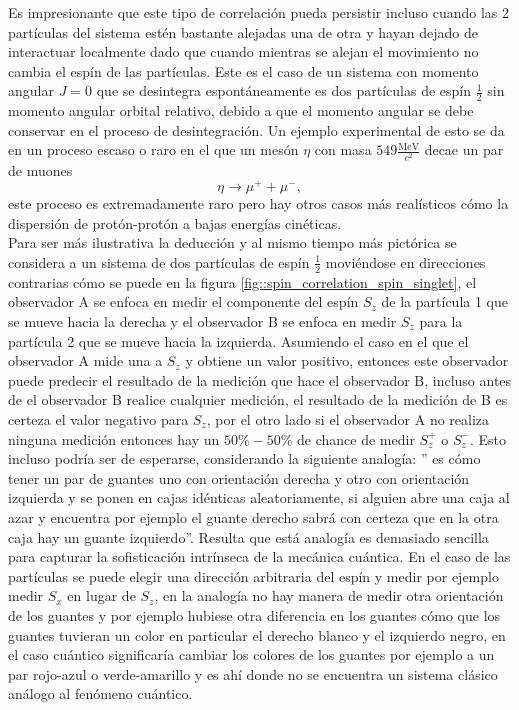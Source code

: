 \documentclass[a4paper]{article}
\begin{document}
Es impresionante que este tipo de correlación pueda persistir incluso cuando las 2 partículas del sistema estén bastante alejadas una de otra y hayan dejado de interactuar localmente dado que cuando mientras se alejan el movimiento no cambia el espín de las partículas. Este es el caso de un sistema con momento angular $J=0$ que se desintegra espontáneamente es dos partículas de espín $\frac{1}{2}$ sin momento angular orbital relativo, debido a que el momento angular se debe conservar en el proceso de desintegración. Un ejemplo experimental de esto se da en un proceso escaso o raro en el que un mesón $\eta$ con masa $549\frac{\text{MeV}}{c^2}$ decae un par de muones
\begin{equation*}
\eta\rightarrow\mu^+ + \mu^- ,
\end{equation*}
este proceso es extremadamente raro pero hay otros casos más realísticos cómo la dispersión de protón-protón a bajas energías cinéticas. \\
Para ser más ilustrativa la deducción y al mismo tiempo más pictórica se considera a un sistema de dos partículas de espín $\frac{1}{2}$ moviéndose en direcciones contrarias cómo se puede en la figura \ref{fig::spin_correlation_spin_singlet}, el observador A se enfoca en medir el componente del espín $S_z$ de la partícula 1 que se mueve hacia la derecha y el observador B se enfoca en medir $S_z$ para la partícula 2 que se mueve hacia la izquierda. Asumiendo el caso en el que el observador A mide una a $S_z$ y obtiene un valor positivo, entonces este observador puede predecir el resultado de la medición que hace el observador B, incluso antes de el observador B realice cualquier medición, el resultado de la medición de B es certeza el valor negativo para $S_z$, por el otro lado si el observador A no realiza ninguna medición entonces hay un $50\%-50\%$ de chance de medir $S_z^+$ o $S_z^-$. Esto incluso podría ser de esperarse, considerando la siguiente analogía: '' es cómo tener un par de guantes uno con orientación derecha y otro con orientación izquierda y se ponen en cajas idénticas aleatoriamente, si alguien abre una caja al azar y encuentra por ejemplo el guante derecho sabrá con certeza que en la otra caja hay un guante izquierdo''. Resulta que está analogía es demasiado sencilla para capturar la sofisticación intrínseca de la mecánica cuántica. En el caso de las partículas se puede elegir una dirección arbitraria del espín y medir por ejemplo medir $S_x$ en lugar de $S_z$, en la analogía no hay manera de medir otra orientación de los guantes y por ejemplo hubiese otra diferencia en los guantes cómo que los guantes tuvieran un color en particular el derecho blanco y el izquierdo negro, en el caso cuántico significaría cambiar los colores de los guantes por ejemplo a un par rojo-azul o verde-amarillo y es ahí donde no se encuentra un sistema clásico análogo al fenómeno cuántico.\\
\end{document}
